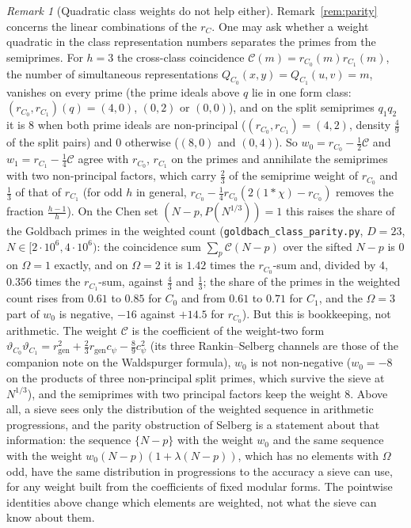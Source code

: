 ﻿\documentclass[11pt]{amsart}
\theoremstyle{remark}
\newtheorem{remark}[theorem]{Remark}
\newcommand{\vt}{\vartheta}
\newcommand{\gen}{\mathrm{gen}}
\begin{document}
\begin{remark}[Quadratic class weights do not help either]\label{rem:hbt}
Remark~\ref{rem:parity} concerns the linear combinations of the $r_C$. One may ask whether a weight quadratic in the class representation numbers separates the primes from the semiprimes. For $h=3$ the cross-class coincidence $\mathcal C(m)=r_{C_0}(m)r_{C_1}(m)$, the number of simultaneous representations $Q_{C_0}(x,y)=Q_{C_1}(u,v)=m$, vanishes on every prime (the prime ideals above $q$ lie in one form class: $(r_{C_0},r_{C_1})(q)=(4,0)$, $(0,2)$ or $(0,0)$), and on the split semiprimes $q_1q_2$ it is $8$ when both prime ideals are non-principal ($(r_{C_0},r_{C_1})=(4,2)$, density $\frac49$ of the split pairs) and $0$ otherwise ($(8,0)$ and $(0,4)$). So $w_0=r_{C_0}-\frac12\mathcal C$ and $w_1=r_{C_1}-\frac14\mathcal C$ agree with $r_{C_0}$, $r_{C_1}$ on the primes and annihilate the semiprimes with two non-principal factors, which carry $\frac23$ of the semiprime weight of $r_{C_0}$ and $\frac13$ of that of $r_{C_1}$ (for odd $h$ in general, $r_{C_0}-\frac14r_{C_0}(2(1*\chi)-r_{C_0})$ removes the fraction $\frac{h-1}h$). On the Chen set $(N-p,P(N^{1/3}))=1$ this raises the share of the Goldbach primes in the weighted count (\texttt{goldbach\_class\_parity.py}, $D=23$, $N\in[2\cdot10^6,4\cdot10^6)$: the coincidence sum $\sum_p\mathcal C(N-p)$ over the sifted $N-p$ is $0$ on $\Omega=1$ exactly, and on $\Omega=2$ it is $1.42$ times the $r_{C_0}$-sum and, divided by $4$, $0.356$ times the $r_{C_1}$-sum, against $\frac43$ and $\frac13$; the share of the primes in the weighted count rises from $0.61$ to $0.85$ for $C_0$ and from $0.61$ to $0.71$ for $C_1$, and the $\Omega=3$ part of $w_0$ is negative, $-16$ against $+14.5$ for $r_{C_0}$). But this is bookkeeping, not arithmetic. The weight $\mathcal C$ is the coefficient of the weight-two form $\vt_{C_0}\vt_{C_1}=r_\gen^2+\frac23r_\gen c_\psi-\frac89c_\psi^2$ (its three Rankin--Selberg channels are those of the companion note on the Waldspurger formula), $w_0$ is not non-negative ($w_0=-8$ on the products of three non-principal split primes, which survive the sieve at $N^{1/3}$), and the semiprimes with two principal factors keep the weight $8$. Above all, a sieve sees only the distribution of the weighted sequence in arithmetic progressions, and the parity obstruction of Selberg is a statement about that information: the sequence $\{N-p\}$ with the weight $w_0$ and the same sequence with the weight $w_0(N-p)(1+\lambda(N-p))$, which has no elements with $\Omega$ odd, have the same distribution in progressions to the accuracy a sieve can use, for any weight built from the coefficients of fixed modular forms. The pointwise identities above change which elements are weighted, not what the sieve can know about them.
\end{remark}
\end{document}
